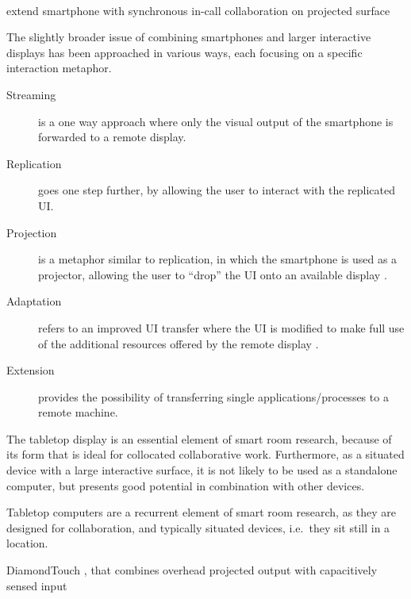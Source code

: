 \hfill\\
\linebreak



extend smartphone with synchronous in-call collaboration on projected surface
\citep{Winkler:2011:interactivephonecall}

The slightly broader issue of combining smartphones and larger interactive displays has been approached in various ways, each focusing on a specific interaction metaphor.
\begin{description}
\item[Streaming] is a one way approach where only the visual output of the smartphone is forwarded to a remote display.
\item[Replication] goes one step further, by allowing the user to interact with the replicated UI.
\item[Projection] is a metaphor similar to replication, in which the smartphone is used as a projector, allowing the user to ``drop'' the UI onto an available display \citep{Winkler:2011:interactivephonecall}.
\item[Adaptation] refers to an improved UI transfer where the UI is modified to make full use of the additional resources offered by the remote display \citep{Arthur:2011:xice}.
\item[Extension] provides the possibility of transferring single applications/processes to a remote  machine.
\end{description}


The tabletop display is an essential element of smart room research, because of its form that is ideal for collocated collaborative work.
Furthermore, as a situated device with a large interactive surface, it is not likely to be used as a standalone computer, but presents good potential in combination with other devices.


Tabletop computers are a recurrent element of smart room research, as they are designed for collaboration, and typically situated devices, i.e.\ they sit still in a location.

DiamondTouch \citep{Dietz:2001:diamondtouch}, that combines overhead projected output with capacitively sensed input

